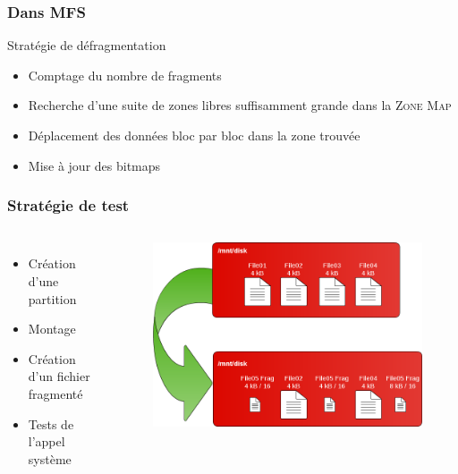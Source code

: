\documentclass[handout]{beamer}
\begin{document}

\begin{frame}
\frametitle{Dans MFS}
\begin{block} {Stratégie de défragmentation}
\begin{itemize}
\item Comptage du nombre de fragments
\item Recherche d'une suite de zones libres suffisamment grande dans la \textsc{Zone Map}
\item Déplacement des données bloc par bloc dans la zone trouvée
\item Mise à jour des bitmaps
\end{itemize}
\end{block}
\end{frame}

\begin{frame}
\frametitle{Stratégie de test}
\begin{columns}[c]
\begin{itemize}
\item Création d'une partition
\item Montage
\item Création d'un fichier fragmenté
\item Tests de l'appel système
\end{itemize}
\begin{figure}
\includegraphics[scale=0.25]{schemas/test.png}
\end{figure}
\end{columns}
\end{frame}
\end{document}
